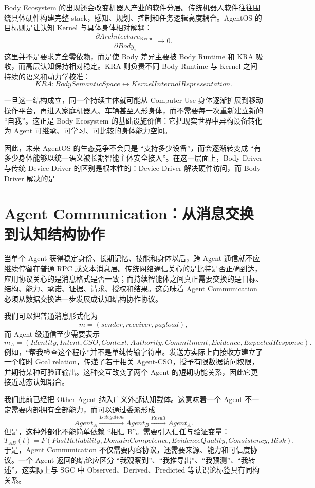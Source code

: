 Body Ecosystem 的出现还会改变机器人产业的软件分层。传统机器人软件往往围绕具体硬件构建完整 stack，感知、规划、控制和任务逻辑高度耦合。AgentOS 的目标则是让认知 Kernel 与具体身体相对解耦：
\[
\frac{\partial Architecture_{\mathrm{Kernel}}}
{\partial Body_i}
\rightarrow 0.
\]
这里并不是要求完全零依赖，而是使 Body 差异主要被 Body Runtime 和 KRA 吸收，而高层认知保持相对稳定。KRA 则负责不同 Body Runtime 与 Kernel 之间持续的语义和动力学校准：
\[
KRA:
BodySemanticSpace
\leftrightarrow
KernelInternalRepresentation.
\]

一旦这一结构成立，同一个持续主体就可能从 Computer Use 身体逐渐扩展到移动操作平台，再进入家庭机器人、车辆甚至人形身体，而不需要每一次重新建立新的 ``自我''。这正是 Body Ecosystem 的基础设施价值：它把现实世界中异构设备转化为 Agent 可继承、可学习、可比较的身体能力空间。

因此，未来 AgentOS 的生态竞争不会只是 ``支持多少设备''，而会逐渐转变成 ``有多少身体能够以统一语义被长期智能主体安全接入''。在这一层面上，Body Driver 与传统 Device Driver 的区别是根本性的：Device Driver 解决硬件访问，而 Body Driver 解决的是
\begin{statementbox}
\centering
{}
\end{statementbox}

\section{Agent Communication：从消息交换到认知结构协作}

当单个 Agent 获得稳定身份、长期记忆、技能和身体以后，跨 Agent 通信就不应继续停留在普通 RPC 或文本消息层。传统网络通信关心的是比特是否正确到达，应用协议关心的是消息格式是否一致；而持续智能体之间真正需要交换的是目标、结构、能力、承诺、证据、请求、授权和结果。这意味着 Agent Communication 必须从数据交换进一步发展成认知结构协作协议。

我们可以把普通消息形式化为
\[
m=(sender,receiver,payload),
\]
而 Agent 级通信至少需要表示
\[
m_A=
(
Identity,
Intent,
CSO,
Context,
Authority,
Commitment,
Evidence,
ExpectedResponse
).
\]
例如，``帮我检查这个程序''并不是单纯传输字符串。发送方实际上向接收方建立了一个临时 Goal relation，传递了若干相关 Agent-CSO，授予有限数据访问权限，并期待某种可验证输出。这种交互改变了两个 Agent 的短期功能关系，因此它更接近动态认知耦合。

我们此前已经把 Other Agent 纳入广义外部认知载体。这意味着一个 Agent 不一定需要内部拥有全部能力，而可以通过委派形成
\[
Agent_A
\xrightarrow{Delegation}
Agent_B
\xrightarrow{Result}
Agent_A.
\]
但是，这种外部化不能简单依赖 ``相信 B''。需要引入信任与验证变量：
\[
T_{AB}(t)
=
F(
PastReliability,
DomainCompetence,
EvidenceQuality,
Consistency,
Risk
).
\]
于是，Agent Communication 不仅需要内容协议，还需要来源、能力和可信度协议。一个 Agent 返回的结论应区分 ``我观察到''、``我推导出''、``我预测''、``我转述''，这实际上与 SGC 中 Observed、Derived、Predicted 等认识论标签具有同构关系。

